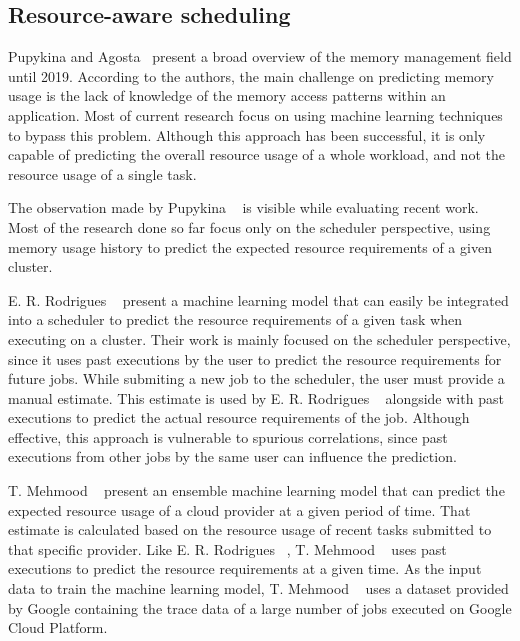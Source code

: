\subsection{Resource-aware scheduling}
\label{subsec:resource-aware-scheduling}

Pupykina and Agosta~\cite{pupykina2019} present a broad overview of the memory management field until 2019.
According to the authors, the main challenge on predicting memory usage is the lack of knowledge of the memory access patterns within an application.
Most of current research focus on using machine learning techniques to bypass this problem.
Although this approach has been successful, it is only capable of predicting the overall resource usage of a whole workload, and not the resource usage of a single task.

The observation made by Pupykina \etal~\cite{pupykina2019} is visible while evaluating recent work.
Most of the research done so far focus only on the scheduler perspective, using memory usage history to predict the expected resource requirements of a given cluster.

E. R. Rodrigues \etal~\cite{rodrigues2016} present a machine learning model that can easily be integrated into a scheduler to predict the resource requirements of a given task when executing on a cluster.
Their work is mainly focused on the scheduler perspective, since it uses past executions by the user to predict the resource requirements for future jobs.
While submiting a new job to the scheduler, the user must provide a manual estimate.
This estimate is used by E. R. Rodrigues \etal~\cite{rodrigues2016} alongside with past executions to predict the actual resource requirements of the job.
Although effective, this approach is vulnerable to spurious correlations, since past executions from other jobs by the same user can influence the prediction.

T. Mehmood \etal~\cite{mehmood2018} present an ensemble machine learning model that can predict the expected resource usage of a cloud provider at a given period of time.
That estimate is calculated based on the resource usage of recent tasks submitted to that specific provider.
Like E. R. Rodrigues \etal~\cite{rodrigues2016}, T. Mehmood \etal~\cite{mehmood2018} uses past executions to predict the resource requirements at a given time.
As the input data to train the machine learning model, T. Mehmood \etal~\cite{mehmood2018} uses a dataset provided by Google containing the trace data of a large number of jobs executed on Google Cloud Platform.

